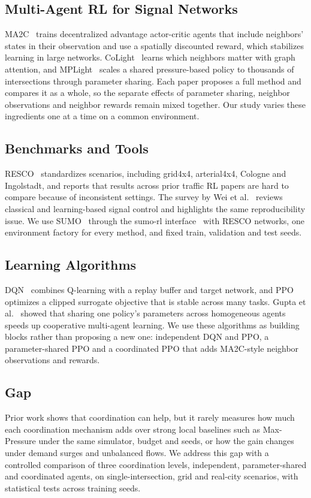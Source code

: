 \documentclass[conference]{IEEEtran}
\begin{document}
\subsection{Multi-Agent RL for Signal Networks}
MA2C~\cite{chu2020ma2c} trains decentralized advantage actor-critic agents that include neighbors' states in their observation and use a spatially discounted reward, which stabilizes learning in large networks. CoLight~\cite{wei2019colight} learns which neighbors matter with graph attention, and MPLight~\cite{chen2020mplight} scales a shared pressure-based policy to thousands of intersections through parameter sharing. Each paper proposes a full method and compares it as a whole, so the separate effects of parameter sharing, neighbor observations and neighbor rewards remain mixed together. Our study varies these ingredients one at a time on a common environment.

\subsection{Benchmarks and Tools}
RESCO~\cite{ault2021resco} standardizes scenarios, including grid4x4, arterial4x4, Cologne and Ingolstadt, and reports that results across prior traffic RL papers are hard to compare because of inconsistent settings. The survey by Wei et al.~\cite{wei2019survey} reviews classical and learning-based signal control and highlights the same reproducibility issue. We use SUMO~\cite{lopez2018sumo} through the sumo-rl interface~\cite{sumorl} with RESCO networks, one environment factory for every method, and fixed train, validation and test seeds.

\subsection{Learning Algorithms}
DQN~\cite{mnih2015dqn} combines Q-learning with a replay buffer and target network, and PPO~\cite{schulman2017ppo} optimizes a clipped surrogate objective that is stable across many tasks. Gupta et al.~\cite{gupta2017cooperative} showed that sharing one policy's parameters across homogeneous agents speeds up cooperative multi-agent learning. We use these algorithms as building blocks rather than proposing a new one: independent DQN and PPO, a parameter-shared PPO and a coordinated PPO that adds MA2C-style neighbor observations and rewards.

\subsection{Gap}
Prior work shows that coordination can help, but it rarely measures how much each coordination mechanism adds over strong local baselines such as Max-Pressure under the same simulator, budget and seeds, or how the gain changes under demand surges and unbalanced flows. We address this gap with a controlled comparison of three coordination levels, independent, parameter-shared and coordinated agents, on single-intersection, grid and real-city scenarios, with statistical tests across training seeds.
\end{document}
